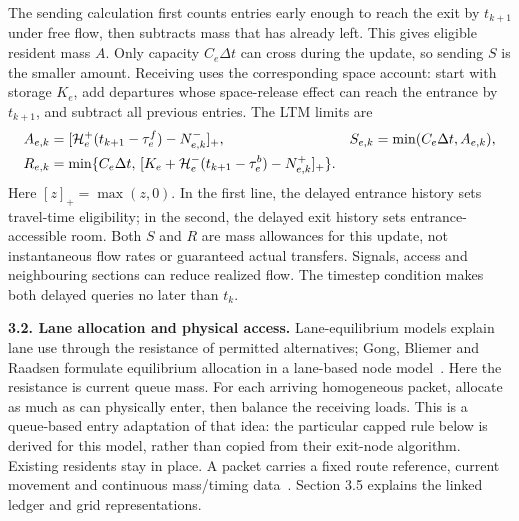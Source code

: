 \documentclass[10pt,a4paper]{article}
\newenvironment{revision}{\begingroup\color{revisionred}}{\par\endgroup}
\newcommand{\pos}[1]{[#1]_+}
\begin{document}
The sending calculation first counts entries early enough to reach the
exit by $t_{k+1}$ under free flow, then subtracts mass that has already
left. This gives eligible resident mass $A$. Only capacity $C_e\Delta t$
can cross during the update, so sending $S$ is the smaller amount.
Receiving uses the corresponding space account: start with storage
$K_e$, add departures whose space-release effect can reach the entrance
by $t_{k+1}$, and subtract all previous entries. The LTM limits are~\cite{m0}
\begin{align}
 A_{e,k}&=\pos{{\cal H}^+_e(t_{k+1}-\tau^f_e)-N^-_{e,k}},
 &S_{e,k}&=\min(C_e\Delta t,A_{e,k}),\label{eq:compact-sending}\\
 R_{e,k}&=\min\{C_e\Delta t,\,
 \pos{K_e+{\cal H}^-_e(t_{k+1}-\tau^b_e)-N^+_{e,k}}\}.
 \label{eq:compact-receiving}
\end{align}
Here $[z]_+=\max(z,0)$. In the first line, the delayed entrance history
sets travel-time eligibility; in the second, the delayed exit history
sets entrance-accessible room. Both $S$ and $R$ are mass allowances for
this update, not instantaneous flow rates or guaranteed actual transfers.
Signals, access and neighbouring sections can reduce realized flow.
The timestep condition makes both delayed queries no later than $t_k$.

\textbf{3.2. Lane allocation and physical access.}
\begin{revision}
Lane-equilibrium models explain lane use through the resistance of
permitted alternatives; Gong, Bliemer and Raadsen formulate equilibrium
allocation in a lane-based node model~\cite{gong}. Here the resistance is
current queue mass. For each arriving homogeneous packet, allocate as much
as can physically enter, then balance the receiving loads. This is a
queue-based entry adaptation of that idea: the particular capped rule
below is derived for this model, rather than copied from their exit-node
algorithm. Existing residents stay in place. A packet carries a fixed
route reference, current movement and continuous mass/timing data~\cite{m1}.
Section 3.5 explains the linked ledger and grid representations.
\end{revision}
\end{document}

